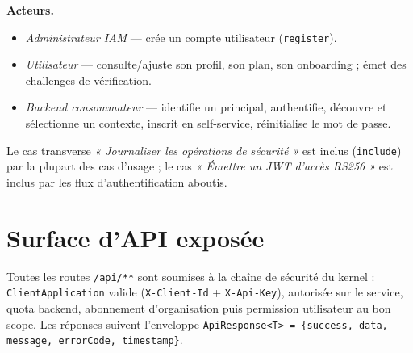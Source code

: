 \documentclass[11pt,a4paper,oneside]{report}
\newcommand{\code}[1]{\texttt{\small #1}}
\begin{document}
\noindent\textbf{Acteurs.}
\begin{itemize}[leftmargin=1.4em,itemsep=1pt]
  \item \emph{Administrateur IAM} — crée un compte utilisateur (\code{register}).
  \item \emph{Utilisateur} — consulte/ajuste son profil, son plan, son onboarding ; émet des challenges de vérification.
  \item \emph{Backend consommateur} — identifie un principal, authentifie, découvre et sélectionne un contexte, inscrit en self-service, réinitialise le mot de passe.
\end{itemize}
Le cas transverse \emph{« Journaliser les opérations de sécurité »} est inclus (\code{include})
par la plupart des cas d'usage ; le cas \emph{« Émettre un JWT d'accès RS256 »} est inclus par
les flux d'authentification aboutis.

\chapter{Surface d'API exposée}
Toutes les routes \code{/api/**} sont soumises à la chaîne de sécurité du kernel :
\code{ClientApplication} valide (\code{X-Client-Id} + \code{X-Api-Key}), autorisée sur le
service, quota backend, abonnement d'organisation puis permission utilisateur au bon scope.
Les réponses suivent l'enveloppe \code{ApiResponse<T> = \{success, data, message, errorCode, timestamp\}}.
\end{document}
